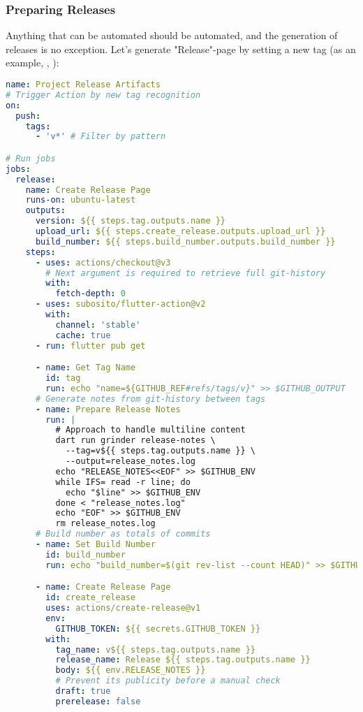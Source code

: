 \subsubsection{Preparing Releases}

Anything that can be automated should be automated, and the generation of releases is no exception. Let's generate 
"Release"-page by setting a new tag (as an example, , ):

\begin{lstlisting}[language=yaml]
name: Project Release Artifacts
# Trigger Action by new tag recognition
on:
  push:
    tags:
      - 'v*' # Filter by pattern

# Run jobs
jobs:
  release:
    name: Create Release Page
    runs-on: ubuntu-latest
    outputs:
      version: ${{ steps.tag.outputs.name }}
      upload_url: ${{ steps.create_release.outputs.upload_url }}
      build_number: ${{ steps.build_number.outputs.build_number }}
    steps:
      - uses: actions/checkout@v3
        # Next argument is required to retrieve full git-history
        with:
          fetch-depth: 0
      - uses: subosito/flutter-action@v2
        with:
          channel: 'stable'
          cache: true
      - run: flutter pub get

      - name: Get Tag Name
        id: tag
        run: echo "name=${GITHUB_REF#refs/tags/v}" >> $GITHUB_OUTPUT
      # Generate notes from git-history between tags
      - name: Prepare Release Notes
        run: |
          # Approach to handle multiline content 
          dart run grinder release-notes \
            --tag=v${{ steps.tag.outputs.name }} \
            --output=release_notes.log
          echo "RELEASE_NOTES<<EOF" >> $GITHUB_ENV
          while IFS= read -r line; do
            echo "$line" >> $GITHUB_ENV
          done < "release_notes.log"
          echo "EOF" >> $GITHUB_ENV
          rm release_notes.log
      # Build number as totals of commits
      - name: Set Build Number
        id: build_number
        run: echo "build_number=$(git rev-list --count HEAD)" >> $GITHUB_OUTPUT

      - name: Create Release Page
        id: create_release
        uses: actions/create-release@v1
        env:
          GITHUB_TOKEN: ${{ secrets.GITHUB_TOKEN }}
        with:
          tag_name: v${{ steps.tag.outputs.name }}
          release_name: Release ${{ steps.tag.outputs.name }}
          body: ${{ env.RELEASE_NOTES }}
          # Prevent its publicity before a manual check
          draft: true
          prerelease: false
\end{lstlisting}

